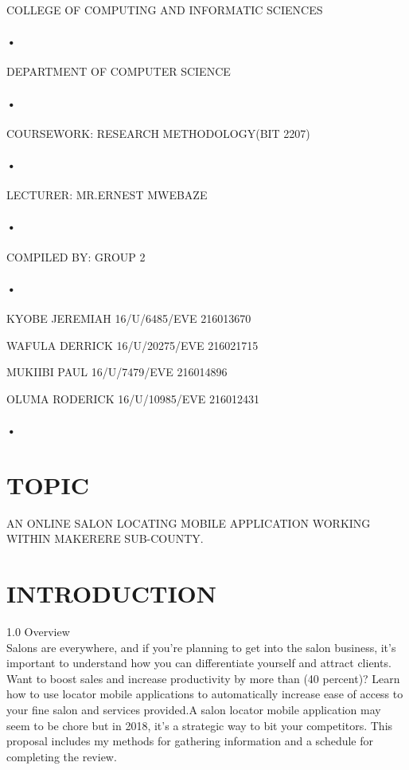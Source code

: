 \documentclass[11pt]{article}
\begin{document}
\begin{titlepage}

\centerline{COLLEGE OF COMPUTING AND INFORMATIC SCIENCES}
\paragraph{•}
\centerline{DEPARTMENT OF COMPUTER SCIENCE\\}
\paragraph{•}

\centerline{COURSEWORK: RESEARCH METHODOLOGY(BIT 2207)\\}
\paragraph{•}

\centerline{LECTURER: MR.ERNEST MWEBAZE}


\paragraph{•}
\centerline{COMPILED BY:
 GROUP 2}
 \paragraph{•}
\centerline{KYOBE JEREMIAH   16/U/6485/EVE    216013670}
\centerline{WAFULA DERRICK    16/U/20275/EVE    216021715}
\centerline{MUKIIBI PAUL       16/U/7479/EVE     216014896}
\centerline{OLUMA  RODERICK   16/U/10985/EVE    216012431}

\paragraph{•}
\end{titlepage}
\tableofcontents
\newpage
{}
\section{TOPIC}
AN ONLINE SALON LOCATING MOBILE APPLICATION WORKING WITHIN MAKERERE SUB-COUNTY.

\section{INTRODUCTION}
1.0	 Overview\\
Salons are everywhere, and if you're planning to get into the salon business, it's important to understand\cite{price1999commercial} how you can differentiate yourself and attract clients. Want to boost sales and increase productivity by more than (40 percent)? Learn how to use locator mobile applications to automatically increase ease of access to your fine salon and services provided.A salon locator mobile application may seem to be chore but in 2018, it's a strategic way to bit your competitors. This proposal includes my methods for gathering information and a schedule for completing the review.\cite{dick2005systematic}
 
\end{document}
